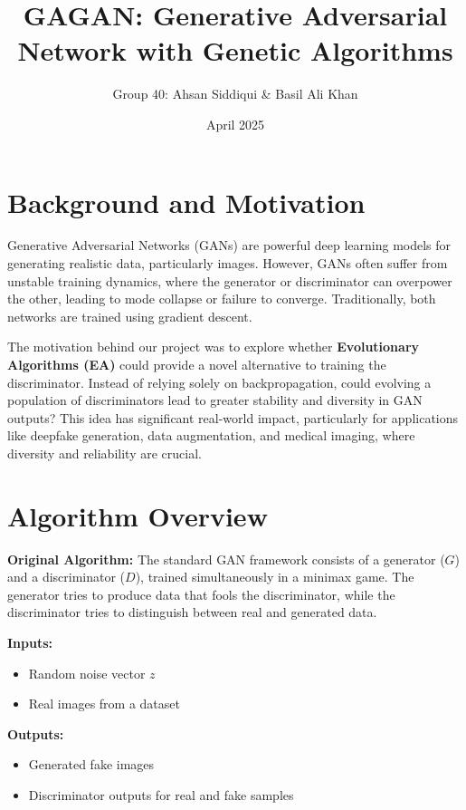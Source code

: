 \documentclass[12pt]{article}
\title{GAGAN: Generative Adversarial Network with Genetic Algorithms}
\author{Group 40: Ahsan Siddiqui \& Basil Ali Khan}
\date{April 2025}
\begin{document}
\maketitle

\tableofcontents
\newpage

\section{Background and Motivation}
Generative Adversarial Networks (GANs) are powerful deep learning models for generating realistic data, particularly images. However, GANs often suffer from unstable training dynamics, where the generator or discriminator can overpower the other, leading to mode collapse or failure to converge. Traditionally, both networks are trained using gradient descent.

The motivation behind our project was to explore whether \textbf{Evolutionary Algorithms (EA)} could provide a novel alternative to training the discriminator. Instead of relying solely on backpropagation, could evolving a population of discriminators lead to greater stability and diversity in GAN outputs? This idea has significant real-world impact, particularly for applications like deepfake generation, data augmentation, and medical imaging, where diversity and reliability are crucial.

\section{Algorithm Overview}
\textbf{Original Algorithm:} The standard GAN framework consists of a generator ($G$) and a discriminator ($D$), trained simultaneously in a minimax game. The generator tries to produce data that fools the discriminator, while the discriminator tries to distinguish between real and generated data.

\textbf{Inputs:}
\begin{itemize}
    \item Random noise vector $z$
    \item Real images from a dataset
\end{itemize}

\textbf{Outputs:}
\begin{itemize}
    \item Generated fake images
    \item Discriminator outputs for real and fake samples
\end{itemize}
\end{document}
